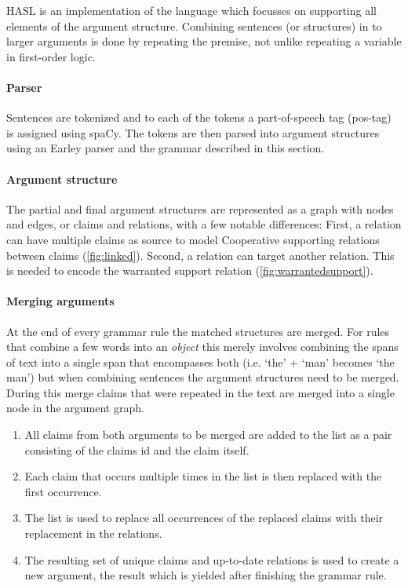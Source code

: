 HASL is an implementation of the language which focusses on supporting all elements of the argument structure. Combining sentences (or structures) in to larger arguments is done by repeating the premise, not unlike repeating a variable in first-order logic.

\paragraph{Parser} Sentences are tokenized and to each of the tokens a part-of-speech tag (pos-tag) is assigned using spaCy\cite{spacy2}. The tokens are then parsed into argument structures using an Earley parser and the grammar described in this section.

\paragraph{Argument structure} The partial and final argument structures are represented as a graph with nodes and edges, or claims and relations, with a few notable differences: First, a relation can have multiple claims as source to model Cooperative supporting relations between claims (\autoref{fig:linked}). Second, a relation can target another relation. This is needed to encode the warranted support relation (\autoref{fig:warrantedsupport}).

\paragraph{Merging arguments} At the end of every grammar rule the matched structures are merged. For rules that combine a few words into an \emph{object} this merely involves combining the spans of text into a single span that encompasses both (i.e. `the' + `man' becomes `the man') but when combining sentences the argument structures need to be merged. During this merge claims that were repeated in the text are merged into a single node in the argument graph.

\begin{enumerate}
    \item All claims from both arguments to be merged are added to the list as a pair consisting of the claims id and the claim itself.
    \item Each claim that occurs multiple times in the list is then replaced with the first occurrence.
    \item The list is used to replace all occurrences of the replaced claims with their replacement in the relations.
    \item The resulting set of unique claims and up-to-date relations is used to create a new argument, the result which is yielded after finishing the grammar rule.
\end{enumerate}


